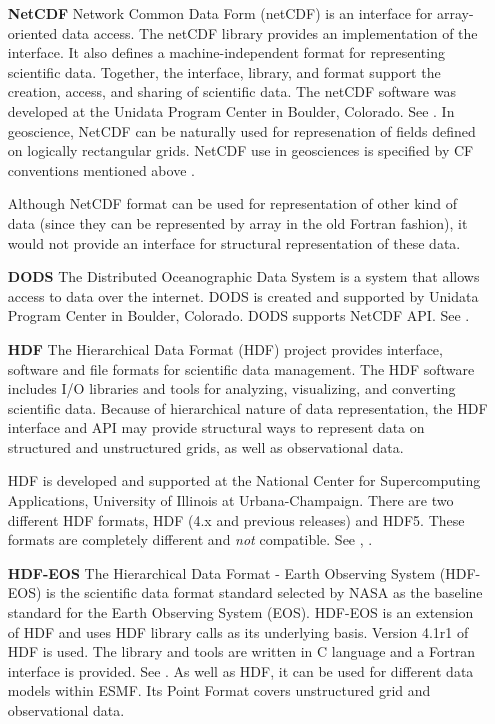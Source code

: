 \begin{itemize}
\item[\bf NetCDF] Network Common Data Form (netCDF) is an interface for 
array-oriented data access. The netCDF library provides an
implementation of the interface. It also defines a 
machine-independent format for representing scientific data. Together,
the interface, library, and format support the creation, access, and
sharing of scientific data. The netCDF software was developed at the
Unidata Program Center in Boulder, Colorado. See \cite{NetCDF3_UsersGuide_C}.
In geoscience, NetCDF can be naturally used for represenation of fields 
defined on logically rectangular grids. NetCDF use in geosciences is 
specified by CF conventions mentioned above \cite{NetCDF_CF_v1_beta3}. 

Although NetCDF format can be used for representation of other kind of
data (since they can be represented by array in the old Fortran
fashion), it would not provide an interface for structural
representation of these data.

\item[\bf DODS] The Distributed Oceanographic Data System is a system that 
allows access to data over the internet. DODS is created and supported by 
Unidata Program Center in Boulder, Colorado. DODS supports NetCDF API. See 
\cite{DODS}.

\item[\bf HDF] The Hierarchical Data Format (HDF) project provides
interface,  software and file formats for scientific data management. 
The HDF software includes I/O libraries and tools for analyzing,
visualizing, and converting scientific data. Because of hierarchical nature 
of data representation, the HDF interface and API may provide structural ways 
to represent data on structured and unstructured grids, as well as 
observational data. 

HDF is developed and supported at the National Center for Supercomputing 
Applications, University of Illinois at Urbana-Champaign. There are two 
different HDF formats, HDF (4.x and previous releases) and HDF5. These 
formats are completely different and {\it not} compatible.  See
\cite{HDF4_tutorials}, \cite{HDF5_tutorial}.

\item[\bf HDF-EOS]  The Hierarchical Data Format - Earth Observing
System (HDF-EOS) is the scientific data format standard selected by
NASA as the baseline standard for the Earth Observing System (EOS). HDF-EOS
is an extension of HDF and uses HDF library calls as its underlying
basis. Version 4.1r1 of HDF is used. The library and tools are written
in C language and a Fortran interface is provided. See \cite{HDF-EOS}.
As well as HDF, it can be used for different data models within ESMF. Its 
Point Format covers unstructured grid and observational data.


\end{itemize}

